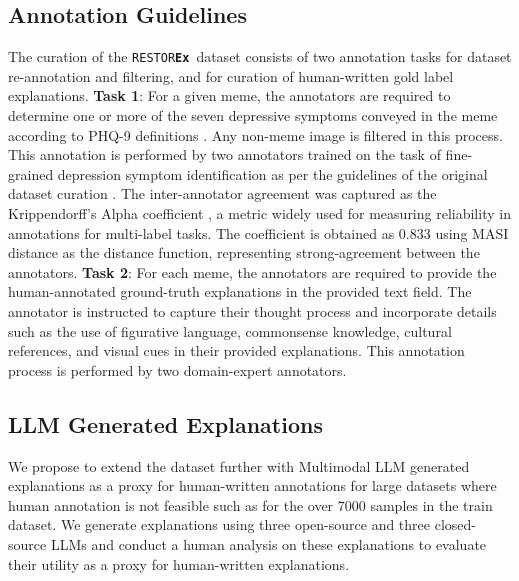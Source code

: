 \documentclass[letterpaper]{article} %
\newcommand{\dataset}{\texttt{RESTOR\textbf{Ex}}}
\begin{document}
\subsection{Annotation Guidelines}
The curation of the \dataset\ dataset consists of two annotation tasks for dataset re-annotation and filtering, and for curation of human-written gold label explanations.
\newline
\textbf{Task 1}: For a given meme, the annotators are required to determine one or more of the %
seven depressive symptoms conveyed in the meme %
    according to PHQ-9 definitions \citep{kroenke_phq-9_2001}. Any non-meme image is filtered in this process. This annotation is performed by two annotators trained on the task of fine-grained depression symptom identification as per the guidelines of the original dataset curation \cite{Yadav-etal-2023-towards}. The inter-annotator agreement was captured as the Krippendorff's Alpha coefficient \cite{krippendorff_measuring_2004}, a metric widely used for measuring reliability in annotations for multi-label tasks. The coefficient is obtained as 0.833 using MASI distance \cite{passonneau-2006-measuring} as the distance function, representing strong-agreement between the annotators. 
\newline
\textbf{Task 2}: For each meme, the annotators are required to provide the human-annotated ground-truth explanations in the provided text field. The annotator is instructed to capture their thought process and incorporate details such as the use of figurative language, commonsense knowledge, cultural references, and visual cues in their provided explanations. This annotation process is performed by two domain-expert annotators.

\subsection{LLM Generated Explanations}
We propose to extend the dataset further with Multimodal LLM generated explanations as a proxy for human-written annotations for large datasets where human annotation is not feasible such as for the over 7000 samples in the train dataset. We generate explanations using three open-source and three closed-source LLMs %
and conduct a human analysis on these explanations to evaluate their utility as a proxy for human-written explanations.
\end{document}
